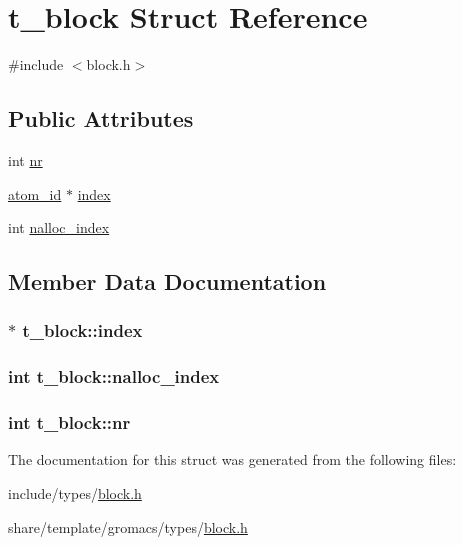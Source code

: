 \hypertarget{structt__block}{\section{t\-\_\-block \-Struct \-Reference}
\label{structt__block}
}


{\ttfamily \#include $<$block.\-h$>$}

\subsection*{\-Public \-Attributes}
\begin{DoxyCompactItemize}
\item 
int \hyperlink{structt__block_af3e80dfea368d75e62de60acf069261d}{nr}
\item 
\hyperlink{include_2types_2simple_8h_ad3f47cdb48677e516e2049719612c737}{atom\-\_\-id} $\ast$ \hyperlink{structt__block_a1f15375377108b8e713346ae52d82feb}{index}
\item 
int \hyperlink{structt__block_a923a7b4f68eec8902b85615f16934bad}{nalloc\-\_\-index}
\end{DoxyCompactItemize}


\subsection{\-Member \-Data \-Documentation}
\hypertarget{structt__block_a1f15375377108b8e713346ae52d82feb}{
\subsubsection[{index}]{ $\ast$ {\bf t\-\_\-block\-::index}}}\label{structt__block_a1f15375377108b8e713346ae52d82feb}
\hypertarget{structt__block_a923a7b4f68eec8902b85615f16934bad}{
\subsubsection[{nalloc\-\_\-index}]{\setlength{\rightskip}{0pt plus 5cm}int {\bf t\-\_\-block\-::nalloc\-\_\-index}}}\label{structt__block_a923a7b4f68eec8902b85615f16934bad}
\hypertarget{structt__block_af3e80dfea368d75e62de60acf069261d}{
\subsubsection[{nr}]{\setlength{\rightskip}{0pt plus 5cm}int {\bf t\-\_\-block\-::nr}}}\label{structt__block_af3e80dfea368d75e62de60acf069261d}


\-The documentation for this struct was generated from the following files\-:\begin{DoxyCompactItemize}
\item 
include/types/\hyperlink{include_2types_2block_8h}{block.\-h}\item 
share/template/gromacs/types/\hyperlink{share_2template_2gromacs_2types_2block_8h}{block.\-h}\end{DoxyCompactItemize}
